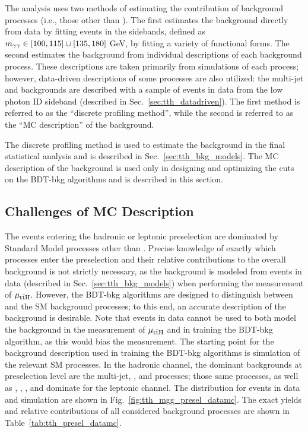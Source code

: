 The analysis uses two methods of estimating the contribution of background processes (i.e., those other than \ttH).
The first estimates the background directly from data by fitting events in the \mgg sidebands, defined as $m_{\gamma\gamma} \in [100, 115] \cup [135, 180]$ GeV, by fitting a variety of functional forms.
The second estimates the background from individual descriptions of each background process.
These descriptions are taken primarily from simulations of each process; however, data-driven descriptions of some processes are also utilized: the multi-jet and \gjets backgrounds are described with a sample of events in data from the low photon ID sideband (described in Sec.~\ref{sec:tth_datadriven}).
The first method is referred to as the ``discrete profiling method'', while the second is referred to as the ``MC description'' of the background.

The discrete profiling method is used to estimate the background in the final statistical analysis and is described in Sec.~\ref{sec:tth_bkg_models}.
The MC description of the background is used only in designing and optimizing the cuts on the BDT-bkg algorithms and is described in this section.

\subsection{Challenges of MC Description} \label{sec:tth_mc_description}
The events entering the hadronic or leptonic preselection are dominated by Standard Model processes other than \ttH.
Precise knowledge of exactly which processes enter the preselection and their relative contributions to the overall background is not strictly necessary, as the background is modeled from events in data (described in Sec.~\ref{sec:tth_bkg_models}) when performing the measurement of $\mu_{\mathrm{t\bar{t}H}}$.
However, the BDT-bkg algorithms are designed to distinguish between \ttH and the SM background processes; to this end, an accurate description of the background is desirable.
Note that events in data cannot be used to both model the background in the measurement of $\mu_{\mathrm{t\bar{t}H}}$ and in training the BDT-bkg algorithm, as this would bias the measurement.
The starting point for the background description used in training the BDT-bkg algorithms is simulation of the relevant SM processes.
In the hadronic channel, the dominant backgrounds at preselection level are the multi-jet, \gjets, and \dipho processes; those same processes, as well as \ttbar, \ttg, \ttgg, and \Vgamma dominate for the leptonic channel.
The \mgg distribution for events in data and simulation are shown in Fig.~\ref{fig:tth_mgg_presel_datamc}.
The exact yields and relative contributions of all considered background processes are shown in Table~\ref{tab:tth_presel_datamc}.

